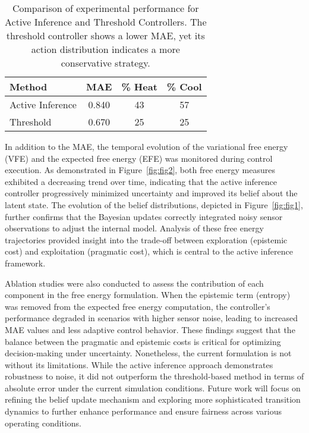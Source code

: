 \documentclass[11pt]{article}
\begin{document}
\begin{table}[H]
\centering
\begin{tabular}{lccc}
\hline
Method & MAE & \% Heat & \% Cool \\ \hline
Active Inference & 0.840 & 43 & 57 \\
Threshold        & 0.670 & 25 & 25  \\ \hline
\end{tabular}
\caption{Comparison of experimental performance for Active Inference and Threshold Controllers. The threshold controller shows a lower MAE, yet its action distribution indicates a more conservative strategy.}
\label{tab:results}
\end{table}

In addition to the MAE, the temporal evolution of the variational free energy (VFE) and the expected free energy (EFE) was monitored during control execution. As demonstrated in Figure~\ref{fig:fig2}, both free energy measures exhibited a decreasing trend over time, indicating that the active inference controller progressively minimized uncertainty and improved its belief about the latent state. The evolution of the belief distributions, depicted in Figure~\ref{fig:fig1}, further confirms that the Bayesian updates correctly integrated noisy sensor observations to adjust the internal model. Analysis of these free energy trajectories provided insight into the trade-off between exploration (epistemic cost) and exploitation (pragmatic cost), which is central to the active inference framework.

Ablation studies were also conducted to assess the contribution of each component in the free energy formulation. When the epistemic term (entropy) was removed from the expected free energy computation, the controller’s performance degraded in scenarios with higher sensor noise, leading to increased MAE values and less adaptive control behavior. These findings suggest that the balance between the pragmatic and epistemic costs is critical for optimizing decision-making under uncertainty. Nonetheless, the current formulation is not without its limitations. While the active inference approach demonstrates robustness to noise, it did not outperform the threshold-based method in terms of absolute error under the current simulation conditions. Future work will focus on refining the belief update mechanism and exploring more sophisticated transition dynamics to further enhance performance and ensure fairness across various operating conditions.
\end{document}
